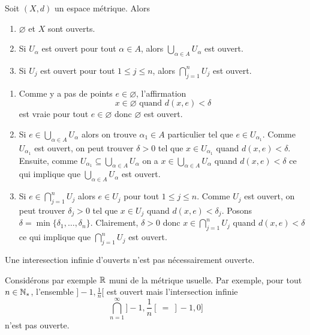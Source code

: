 \documentclass[french]{article}
\begin{document}
\begin{theoreme}
  Soit $(X, d)$ un espace métrique. Alors
  \begin{enumerate}
    \item $\varnothing$ et $X$ sont ouverts.
    \item Si $U_\alpha$ est ouvert pour tout $\alpha \in A$, alors $\bigcup\limits_{\alpha \in A} U_\alpha$ est ouvert.
    \item Si $U_j$ est ouvert pour tout $1 \leq j \leq n$, alors $\bigcap\limits_{j=1}^{n} U_j$ est ouvert.
  \end{enumerate}

  \tcblower
  \begin{preuve}
    \begin{enumerate}
      \item Comme y a pas de points $e \in \varnothing$, l'affirmation
        $$x \in \varnothing \text{ quand } d(x, e) < \delta$$
        est vraie pour tout $e \in \varnothing$ donc $\varnothing$ est ouvert.
      \item Si $e \in \bigcup\limits_{\alpha \in A} U_\alpha$ alors on trouve $\alpha_1 \in A$ particulier tel que $e \in U_{\alpha_1}$. Comme $U_{\alpha_1}$ est ouvert, on peut trouver $\delta > 0$ tel que $x \in U_{\alpha_1}$ quand $d(x, e) < \delta$. 
        \newline Ensuite, comme $U_{\alpha_1} \subseteq \bigcup\limits_{\alpha \in A} U_\alpha$ on a $x \in \bigcup\limits_{\alpha \in A} U_\alpha$ quand $d(x, e) < \delta$ ce qui implique que $\bigcup\limits_{\alpha \in A} U_\alpha$ est ouvert.
      \item Si $e \in \bigcap\limits_{j=1}^{n} U_j$ alors $e \in U_j$ pour tout $1 \leq j \leq n$. Comme $U_j$ est ouvert, on peut trouver $\delta_j > 0$ tel que $x \in U_j$ quand $d(x, e) < \delta_j$.
        \newline Posons $\delta = \min\{\delta_1, \dots, \delta_n\}$. Clairement, $\delta > 0$ donc $x \in \bigcap\limits_{j=1}^{n} U_j$ quand $d(x, e) < \delta$ ce qui implique que $\bigcap\limits_{j=1}^{n} U_j$ est ouvert.
    \end{enumerate}
  \end{preuve}
\end{theoreme}
\begin{remarque}
  Une interesection infinie d'ouverts n'est pas nécessairement ouverte.
\end{remarque}
Considérons par exemple $\mathbb{R}$ muni de la métrique usuelle. Par exemple, pour tout $n \in \mathbb{N}_*$, l'ensemble $]-1, \frac{1}{n}[$ est ouvert mais l'intersection infinie $$\bigcap\limits_{n=1}^{\infty} ]-1, \frac{1}{n}[ \: = \: ]-1, 0]$$ n'est pas ouverte.
\end{document}
